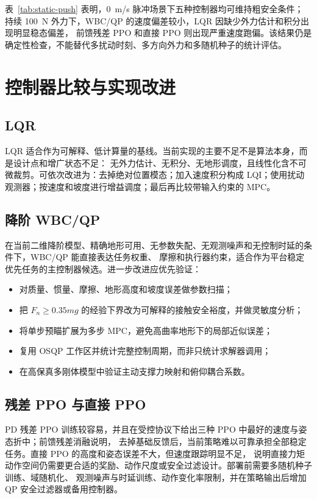 \documentclass[UTF8,12pt,a4paper,fontset=none]{ctexart}
\begin{document}
表~\ref{tab:static-push} 表明，\SI{0}{m/s} 脉冲场景下五种控制器均可维持粗安全条件；
持续 \SI{100}{N} 外力下，WBC/QP 的速度偏差较小，LQR 因缺少外力估计和积分出现明显稳态偏差，
前馈残差 PPO 和直接 PPO 则出现严重速度跑偏。该结果仍是确定性检查，不能替代多扰动时刻、多方向外力和多随机种子的统计评估。

\FloatBarrier
\section{控制器比较与实现改进}

\subsection{LQR}
LQR 适合作为可解释、低计算量的基线。当前实现的主要不足不是算法本身，而是设计点和增广状态不足：
无外力估计、无积分、无地形调度，且线性化含不可微裁剪。可依次改进为：去掉绝对位置模态；加入速度积分构成
LQI；使用扰动观测器；按速度和坡度进行增益调度；最后再比较带输入约束的 MPC。

\subsection{降阶 WBC/QP}
在当前二维降阶模型、精确地形可用、无参数失配、无观测噪声和无控制时延的条件下，WBC/QP 能直接表达任务权重、
摩擦和执行器约束，适合作为平台稳定优先任务的主控制器候选。进一步改进应优先验证：
\begin{itemize}
  \item 对质量、惯量、摩擦、地形高度和坡度误差做参数扫描；
  \item 把 $F_n\ge0.35mg$ 的经验下界改为可解释的接触安全裕度，并做灵敏度分析；
  \item 将单步预瞄扩展为多步 MPC，避免高曲率地形下的局部近似误差；
  \item 复用 OSQP 工作区并统计完整控制周期，而非只统计求解器调用；
  \item 在高保真多刚体模型中验证主动支撑力映射和俯仰耦合系数。
\end{itemize}

\subsection{残差 PPO 与直接 PPO}
PD 残差 PPO 训练较容易，并且在受控协议下给出三种 PPO 中最好的速度与姿态折中；前馈残差消融说明，
去掉基础反馈后，当前策略难以可靠承担全部稳定任务。直接 PPO 的高度和姿态误差不大，但速度跟踪明显不足，
说明直接力矩动作空间仍需要更合适的奖励、动作尺度或安全过滤设计。部署前需要多随机种子训练、域随机化、
观测噪声与时延训练、动作变化率限制，并在策略输出后增加 QP 安全过滤器或备用控制器。
\end{document}
